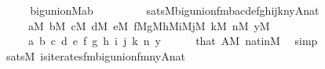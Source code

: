 \begin{isabellebody}
%
\isadelimproof
%
\endisadelimproof
%
\isatagproof
{}\isamarkupfalse%
\ {\isacharminus}{\kern0pt}\isanewline
\ \ \isamarkupfalse%
\ {\isachardoublequoteopen}big{\isacharunderscore}{\kern0pt}union{\isacharparenleft}{\kern0pt}{\isacharhash}{\kern0pt}{\isacharhash}{\kern0pt}M{\isacharcomma}{\kern0pt}a{\isacharcomma}{\kern0pt}b{\isacharparenright}{\kern0pt}\ {\isasymlongleftrightarrow}\isanewline
\ \ \ \ \ \ \ \ sats{\isacharparenleft}{\kern0pt}M{\isacharcomma}{\kern0pt}big{\isacharunderscore}{\kern0pt}union{\isacharunderscore}{\kern0pt}fm{\isacharparenleft}{\kern0pt}{}{\isacharcomma}{\kern0pt}{}{\isacharparenright}{\kern0pt}{\isacharcomma}{\kern0pt}{\isacharbrackleft}{\kern0pt}b{\isacharcomma}{\kern0pt}a{\isacharcomma}{\kern0pt}c{\isacharcomma}{\kern0pt}d{\isacharcomma}{\kern0pt}e{\isacharcomma}{\kern0pt}f{\isacharcomma}{\kern0pt}g{\isacharcomma}{\kern0pt}h{\isacharcomma}{\kern0pt}i{\isacharcomma}{\kern0pt}j{\isacharcomma}{\kern0pt}k{\isacharcomma}{\kern0pt}n{\isacharcomma}{\kern0pt}y{\isacharcomma}{\kern0pt}A{\isacharcomma}{\kern0pt}nat{\isacharbrackright}{\kern0pt}{\isacharparenright}{\kern0pt}{\isachardoublequoteclose}\isanewline
\ \ \ \ \ {\isachardoublequoteopen}a{\isasymin}M{\isachardoublequoteclose}\ {\isachardoublequoteopen}b{\isasymin}M{\isachardoublequoteclose}\ {\isachardoublequoteopen}c{\isasymin}M{\isachardoublequoteclose}\ {\isachardoublequoteopen}d{\isasymin}M{\isachardoublequoteclose}\ {\isachardoublequoteopen}e{\isasymin}M{\isachardoublequoteclose}\ {\isachardoublequoteopen}f{\isasymin}M{\isachardoublequoteclose}{\isachardoublequoteopen}g{\isasymin}M{\isachardoublequoteclose}{\isachardoublequoteopen}h{\isasymin}M{\isachardoublequoteclose}{\isachardoublequoteopen}i{\isasymin}M{\isachardoublequoteclose}{\isachardoublequoteopen}j{\isasymin}M{\isachardoublequoteclose}\ {\isachardoublequoteopen}k{\isasymin}M{\isachardoublequoteclose}\ {\isachardoublequoteopen}n{\isasymin}M{\isachardoublequoteclose}\ {\isachardoublequoteopen}y{\isasymin}M{\isachardoublequoteclose}\isanewline
\ \ \ \ \ a\ b\ c\ d\ e\ f\ g\ h\ i\ j\ k\ n\ y\isanewline
\ \ \ \ \isamarkupfalse%
\ that\ {\isacartoucheopen}A{\isasymin}M{\isacartoucheclose}\ nat{\isacharunderscore}{\kern0pt}in{\isacharunderscore}{\kern0pt}M\ \isamarkupfalse%
\ simp\isanewline
\ \ \isamarkupfalse%
\isanewline
\ \ \isamarkupfalse%
\ {}{\isacharcolon}{\kern0pt}{\isachardoublequoteopen}sats{\isacharparenleft}{\kern0pt}M{\isacharcomma}{\kern0pt}\ is{\isacharunderscore}{\kern0pt}iterates{\isacharunderscore}{\kern0pt}fm{\isacharparenleft}{\kern0pt}big{\isacharunderscore}{\kern0pt}union{\isacharunderscore}{\kern0pt}fm{\isacharparenleft}{\kern0pt}{}{\isacharcomma}{\kern0pt}{}{\isacharparenright}{\kern0pt}{\isacharcomma}{\kern0pt}{}{\isacharcomma}{\kern0pt}{}{\isacharcomma}{\kern0pt}{}{\isacharparenright}{\kern0pt}{\isacharcomma}{\kern0pt}{\isacharbrackleft}{\kern0pt}n{\isacharcomma}{\kern0pt}y{\isacharcomma}{\kern0pt}A{\isacharcomma}{\kern0pt}nat{\isacharbrackright}{\kern0pt}\ {\isacharparenright}{\kern0pt}\ {\isasymlongleftrightarrow}\isanewline

\end{isabellebody}
